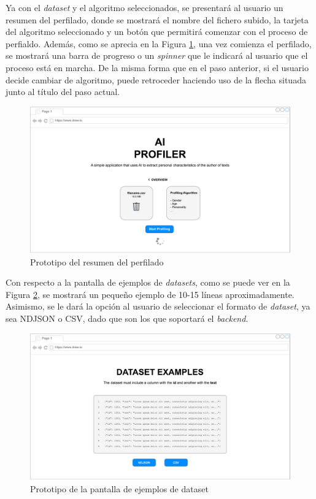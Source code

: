 \bigskip
Ya con el \textit{dataset} y el algoritmo seleccionados, se presentará al usuario un resumen del perfilado, donde se mostrará
el nombre del fichero subido, la tarjeta del algoritmo seleccionado y un botón que permitirá comenzar con el proceso de perfialdo.
Además, como se aprecia en la Figura \ref{fig:prototipo_resumen_perfilado}, una vez comienza el perfilado, se mostrará una barra de progreso
o un \textit{spinner} que le indicará al usuario que el proceso está en marcha. De la misma forma que en el paso anterior, si el usuario
decide cambiar de algoritmo, puede retroceder haciendo uso de la flecha situada junto al título del paso actual.

\bigskip
\begin{figure}[H]
	\centering
	\includegraphics[width=\textwidth]{diagramas/landing-overview.pdf}
	\caption{Prototipo del resumen del perfilado}
	\label{fig:prototipo_resumen_perfilado}
\end{figure}

\bigskip
Con respecto a la pantalla de ejemplos de \textit{datasets}, como se puede ver en la Figura \ref{fig:prototipo_ejemplos_dataset},
se mostrará un pequeño ejemplo de 10-15 líneas aproximadamente. Asimismo, se le dará la opción al usuario de seleccionar el 
formato de \textit{dataset}, ya sea NDJSON o CSV, dado que son los que soportará el \textit{backend}.

\bigskip
\begin{figure}[H]
	\centering
	\includegraphics[width=\textwidth]{diagramas/dataset-examples.pdf}
	\caption{Prototipo de la pantalla de ejemplos de dataset}
	\label{fig:prototipo_ejemplos_dataset}
\end{figure}

